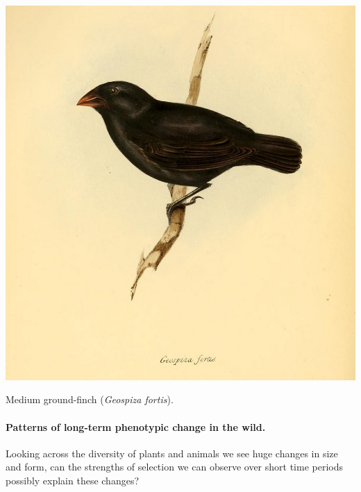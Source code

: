 \begin{marginfigure}[1cm]
\begin{center}
\includegraphics[width= \textwidth]{illustration_images/Quant_gen/Darwins_Finch/Geospiza_fortis.png}
\end{center}
\caption{Medium ground-finch ({\it Geospiza fortis}). } \label{fig:Geospiza_fortis}  
\end{marginfigure}


\paragraph{Patterns of long-term phenotypic change in the wild.}
Looking across the diversity of plants and animals we see huge changes
in size and form, can the strengths of selection we can observe over short time periods possibly explain
these changes?


